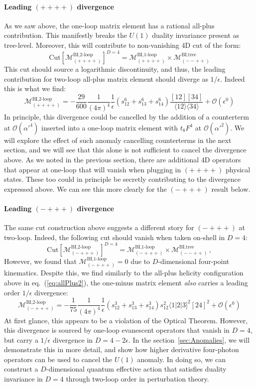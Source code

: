\documentclass[12pt,letter]{article}
\def\sect#1{section~\ref{#1}}
\def\eqn#1{eq.~(\ref{#1})}
\def\be{\begin{equation}}
\def\ee{\end{equation}}
\begin{document}
\paragraph{Leading $(++++)$ divergence} As we saw above, the one-loop matrix element has a rational all-plus contribution. This manifestly breaks the $U(1)$ duality invariance present as tree-level. Moreover, this will contribute to non-vanishing 4D cut of the form:
\be
\text{Cut}\left[\mathcal{M}^{\text{BI,2-loop}}_{(++++)} \right]^{D=4} = \mathcal{M}^{\text{BI,1-loop}}_{(++++)} \times \mathcal{M}^{\text{BI,tree}}_{(--++)} 
\ee
This cut should source a logarithmic discontinuity, and thus, the leading contribution for two-loop all-plus matrix element should diverge as $1/\epsilon$. Indeed this is what we find:
\be\label{eq:allPlus2}
\boxed{\mathcal{M}^{\text{BI,2-loop}}_{(++++)} = -\frac{29}{600} \frac{1}{(4\pi)^4}\frac{1}{\epsilon}(s_{12}^6+s_{13}^6+s_{14}^6)\frac{[12][34]}{\langle 12\rangle \langle 34\rangle }+\mathcal{O}(\epsilon^0)}
\ee
In principle, this divergence could be cancelled by the addition of a counterterm at $\mathcal{O}(\alpha'^4)$ inserted into a one-loop matrix element with $t_8F^4$ at $\mathcal{O}(\alpha'^2)$. We will explore the effect of such anomaly cancelling counterterms in the next section, and we will see that this alone is not sufficient to cancel the divergence above. As we noted in the previous section, there are additional 4D operators that appear at one-loop that will vanish when plugging in $(++++)$ physical states. These too could in principle be secretly contributing to the divergence expressed above. We can see this more clearly for the $(-+++)$ result below. 
\paragraph{Leading $(-+++)$ divergence} The same cut construction above suggests a different story for $(-+++)$ at two-loop. Indeed, the following cut should vanish when taken on-shell in $D=4$:
\be
\text{Cut}\left[\mathcal{M}^{\text{BI,2-loop}}_{(-+++)} \right]^{D=4} = \mathcal{M}^{\text{BI,1-loop}}_{(-+++)} \times \mathcal{M}^{\text{BI,tree}}_{(--++)}\,,
\ee
However, we found that $\mathcal{M}^{\text{BI,1-loop}}_{(-+++)} =0$ due to $D$-dimensional four-point kinematics. Despite this, we find similarly to the all-plus helicity configuration above in \eqn{eq:allPlus2}, the one-minus matrix element \textit{also} carries a leading order $1/\epsilon$ divergence:
\be\label{eq:oneMinus2loop}
\boxed{\mathcal{M}^{\text{BI,2-loop}}_{(-+++)} = -\frac{1}{75} \frac{1}{(4\pi)^4}\frac{1}{\epsilon}(s_{12}^3+s_{13}^3+s_{14}^3)s_{12}^2 \langle 1|2|3]^2[24]^2 +\mathcal{O}(\epsilon^0)}
\ee
At first glance, this appears to be a violation of the Optical Theorem. However, this divergence is sourced by one-loop evanescent operators that vanish in $D=4$, but carry a $1/\epsilon$ divergence in $D=4-2\epsilon$. In the \sect{sec:Anomalies}, we will demonstrate this in more detail, and show how higher derivative four-photon operators can be used to cancel the $U(1)$ anomaly. In doing so, we can construct a $D$-dimensional quantum effective action that satisfies duality invariance in $D=4$ through two-loop order in perturbation theory.  
\end{document}
